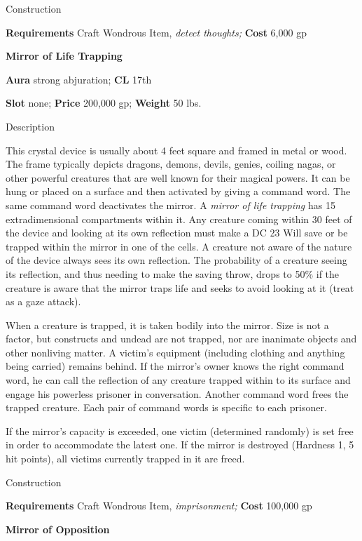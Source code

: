 Construction
				
\textbf{Requirements} Craft Wondrous Item,\textit{ detect thoughts;}\textbf{ Cost }6,000 gp
				
\textbf{Mirror of Life Trapping}
				
\textbf{Aura} strong abjuration;\textbf{ CL }17th
				
\textbf{Slot} none; \textbf{Price} 200,000 gp; \textbf{Weight} 50 lbs.
				
Description
				
This crystal device is usually about 4 feet square and framed in metal or wood. The frame typically depicts dragons, demons, devils, genies, coiling nagas, or other powerful creatures that are well known for their magical powers. It can be hung or placed on a surface and then activated by giving a command word. The same command word deactivates the mirror. A \textit{mirror of life trapping} has 15 extradimensional compartments within it. Any creature coming within 30 feet of the device and looking at its own reflection must make a DC 23 Will save or be trapped within the mirror in one of the cells. A creature not aware of the nature of the device always sees its own reflection. The probability of a creature seeing its reflection, and thus needing to make the saving throw, drops to 50\% if the creature is aware that the mirror traps life and seeks to avoid looking at it (treat as a gaze attack).
				
When a creature is trapped, it is taken bodily into the mirror. Size is not a factor, but constructs and undead are not trapped, nor are inanimate objects and other nonliving matter. A victim's equipment (including clothing and anything being carried) remains behind. If the mirror's owner knows the right command word, he can call the reflection of any creature trapped within to its surface and engage his powerless prisoner in conversation. Another command word frees the trapped creature. Each pair of command words is specific to each prisoner.
				
If the mirror's capacity is exceeded, one victim (determined randomly) is set free in order to accommodate the latest one. If the mirror is destroyed (Hardness 1, 5 hit points), all victims currently trapped in it are freed. 
				
Construction
				
\textbf{Requirements} Craft Wondrous Item,\textit{ imprisonment;}\textbf{ Cost }100,000 gp
				
\textbf{Mirror of Opposition}
				
